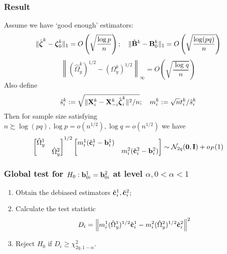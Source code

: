 \documentclass[10pt]{beamer}
\theoremstyle{definition}
\begin{document}
\begin{frame}
\frametitle{Result}
Assume we have `good enough' estimators:
%
\[
\| \hat {{\boldsymbol{\zeta}}}^k - {\boldsymbol{\zeta}}_0^k \|_1 = O \left( \sqrt { \frac{\log p}{n}} \right); \quad
\| \hat {{\mathbf{B}}}^k - {\mathbf{B}}^k_0 \|_1 = O \left( \sqrt{\frac{\log (pq)}{n}} \right)
\]
\[
\left\| (\hat \Omega_y^k)^{1/2} - (\Omega_y^k)^{1/2} \right\|_\infty = O \left( \sqrt { \frac{\log q}{n}} \right)
\]
%
Also define
%
\[
\hat s_i^k := \sqrt{\| {\mathbf{X}}_i^k - {\mathbf{X}}_{-i}^k \hat {{\boldsymbol{\zeta}}}_i^k \|^2/n}; \quad
m_i^k := \sqrt n t_i^k / \hat s_i^k
\]
%
Then for sample size satisfying $n \succsim \log (pq), \log p = o(n^{1/2}), \log q = o(n^{1/2})$ we have
%
\begin{align*}
\begin{bmatrix}
\hat \Omega_y^1 &\\
& \hat \Omega_y^2
\end{bmatrix}^{1/2}
%
\begin{bmatrix}
m_i^1 (\hat \bfc_i^1 - \bfb_i^1) &\\
&  m_i^2 (\hat \bfc_i^2 - \bfb_i^2)
\end{bmatrix}
\sim \cN_{2q} ({\bf 0}, \bfI) + o_P(1)
\end{align*}

\end{frame}

\begin{frame}
\frametitle{Global test for $H_0: {\bf{b}}_{0 i}^1 = {\bf{b}}_{0 i}^2$ at level $\alpha, 0< \alpha< 1$}
\begin{enumerate}
\item Obtain the debiased estimators $\hat {{\bf{c}}}_i^1, \hat {{\bf{c}}}_i^2$;

\item Calculate the test statistic
%
$$
D_i = \left\| m_i^1 (\hat \Omega_y^1)^{1/2} \hat {{\bf{c}}}_i^1 - 
 m_i^2 (\hat \Omega_y^2)^{1/2} \hat {{\bf{c}}}_i^2 \right\|^2
$$
%

\item Reject $H_0$ if $D_i \geq \chi^2_{2q, 1-\alpha}$.
\end{enumerate}
\end{frame}
\end{document}
